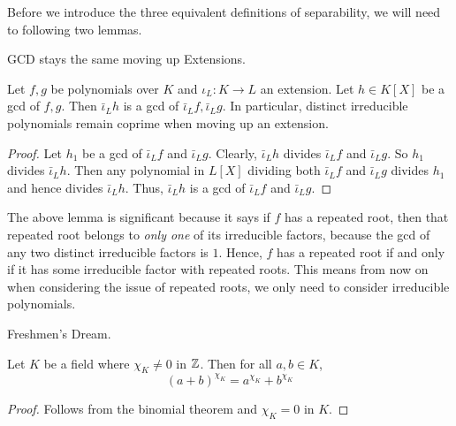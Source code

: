 \documentclass[../book.tex]{subfiles}
\begin{document}
Before we introduce the three equivalent definitions of separability, 
we will need to following two lemmas. 
\begin{lem} GCD stays the same moving up Extensions. 
    
    Let $f, g$ be polynomials over $K$ and $\iota_L : K \to L$ an extension.
    Let $h \in K[X]$ be a gcd of $f, g$. 
    Then $\bar\iota_L h$ is a gcd of $\bar\iota_L f, \bar\iota_L g$. 
    In particular, distinct irreducible polynomials remain coprime 
    when moving up an extension. 
\end{lem}
\begin{proof}
    Let $h_1$ be a gcd of $\bar\iota_L f$ and $\bar\iota_L g$. 
    Clearly, $\bar\iota_L h$ divides $\bar\iota_L f$ and $\bar\iota_L g$. 
    So $h_1$ divides $\bar\iota_L h$. 
    Then any polynomial in $L[X]$ dividing both $\bar\iota_L f$ and $\bar\iota_L g$
    divides $h_1$ and hence divides $\bar\iota_L h$. 
    Thus, $\bar\iota_L h$ is a gcd of $\bar\iota_L f$ and $\bar\iota_L g$. 
\end{proof}
\begin{rmk}
    The above lemma is significant because it says
    if $f$ has a repeated root, then that repeated root belongs to 
    \emph{only one} of its irreducible factors, 
    because the gcd of any two distinct irreducible factors is $1$. 
    Hence, $f$ has a repeated root if and only if it has some
    irreducible factor with repeated roots. 
    This means from now on when considering the issue of repeated roots, 
    we only need to consider irreducible polynomials. 
\end{rmk}
\begin{lem} Freshmen's Dream.
    
    Let $K$ be a field where $\chi_K \neq 0$ in $\mathbb{Z}$. 
    Then for all $a, b \in K$, \[
        (a+b)^{\chi_K} = a^{\chi_K} + b^{\chi_K}
    \]
\end{lem}
\begin{proof}
    Follows from the binomial theorem and $\chi_K = 0$ in $K$. 
\end{proof}
\end{document}

